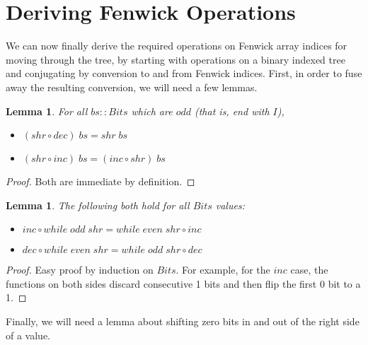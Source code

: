 \documentclass{jfp}
\newcommand{\Conid}[1]{\mathit{#1}}
\newcommand{\Varid}[1]{\mathit{#1}}
\newtheorem{lem}[thm]{Lemma}
\theoremstyle{definition}
\theoremstyle{remark}
\begin{document}
\section{Deriving Fenwick Operations} \label{sec:fenwick-ops}

We can now finally derive the required operations on Fenwick array
indices for moving through the tree, by starting with operations on a
binary indexed tree and conjugating by conversion to and from Fenwick
indices.  First, in order to fuse away the resulting conversion, we
will need a few lemmas.

\begin{lem} \label{lem:incshr}
  For all \ensuremath{\Varid{bs}\mathbin{::}\Conid{Bits}} which are \ensuremath{\Varid{odd}} (that is, end with \ensuremath{\Conid{I}}),
  \begin{itemize}
  \item \ensuremath{(\Varid{shr}\mathbin{\circ}\Varid{dec})\;\Varid{bs}\mathrel{=}\Varid{shr}\;\Varid{bs}}
  \item \ensuremath{(\Varid{shr}\mathbin{\circ}\Varid{inc})\;\Varid{bs}\mathrel{=}(\Varid{inc}\mathbin{\circ}\Varid{shr})\;\Varid{bs}}
  \end{itemize}
\end{lem}
\begin{proof}
  Both are immediate by definition.
\end{proof}

\begin{lem} \label{lem:incwhile}
  The following both hold for all \ensuremath{\Conid{Bits}} values:
  \begin{itemize}
  \item \ensuremath{\Varid{inc}\mathbin{\circ}\Varid{while}\;\Varid{odd}\;\Varid{shr}\mathrel{=}\Varid{while}\;\Varid{even}\;\Varid{shr}\mathbin{\circ}\Varid{inc}}
  \item \ensuremath{\Varid{dec}\mathbin{\circ}\Varid{while}\;\Varid{even}\;\Varid{shr}\mathrel{=}\Varid{while}\;\Varid{odd}\;\Varid{shr}\mathbin{\circ}\Varid{dec}}
  \end{itemize}
\end{lem}
\begin{proof}
  Easy proof by induction on \ensuremath{\Conid{Bits}}.  For example, for the \ensuremath{\Varid{inc}} case,
  the functions on both sides discard consecutive 1 bits and then flip
  the first 0 bit to a 1.
\end{proof}

Finally, we will need a lemma about shifting zero bits in and out of
the right side of a value.
\end{document}
